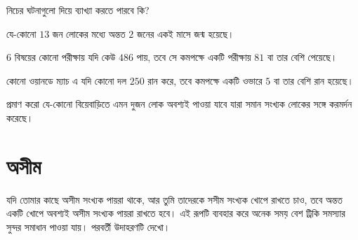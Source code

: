 \begin{diybox}
	নিচের ঘটনাগুলো \phpname{} দিয়ে ব্যাখ্যা করতে পারবে কি?
	\begin{smartlist}
		\item যে-কোনো $13$ জন লোকের মধ্যে অন্তত $2$ জনের একই মাসে জন্ম হয়েছে।
		\item $6$ বিষয়ের কোনো পরীক্ষায় যদি কেউ $486$ পায়, তবে সে কমপক্ষে একটি পরীক্ষায় $81$ বা তার বেশি পেয়েছে।
		\item কোনো ওয়ানডে ম্যাচ এ যদি কোনো দল $250$ রান করে, তবে কমপক্ষে একটি ওভারে $5$ বা তার বেশি রান হয়েছে।
		\item প্রমাণ করো যে-কোনো বিয়েবাড়িতে এমন দুজন লোক অবশ্যই পাওয়া যাবে যারা সমান সংখ্যক লোকের সঙ্গে করমর্দন করেছে।
	\end{smartlist}
\end{diybox}

\section{\texorpdfstring{অসীম \phpname}{অসীম পিজিয়নহোল প্রিন্সিপল}}
যদি তোমার কাছে অসীম সংখ্যক পায়রা থাকে, আর তুমি তাদেরকে সসীম সংখ্যক খোপে রাখতে চাও, তবে অন্তত একটি খোপে অবশ্যই অসীম সংখ্যক পায়রা রাখতে হবে। \phpnamer{} এই রূপটি ব্যবহার করে অনেক সময় বেশ ট্রিকি সমস্যার সুন্দর সমাধান পাওয়া যায়। পরবর্তী উদাহরণটি দেখো।

